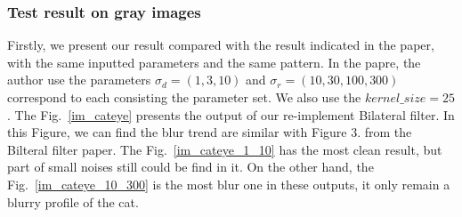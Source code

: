 \documentclass[12pt]{article}
\begin{document}
\subsubsection{Test result on gray images}
\label{subsection test gray}
Firstly, we present our result compared with the result indicated in the paper, with the same inputted parameters and the same pattern.
In the papre, the author use the parameters $\sigma_d = (1, 3, 10)$ and $\sigma_r = (10, 30, 100, 300)$ correspond to each consisting the parameter set.  
We also use the $kernel\_size = 25$.
The Fig.~\ref{im_cateye} presents the output of our re-implement Bilateral filter.
In this Figure, we can find the blur trend are similar with Figure 3. from the Bilteral filter paper.
The Fig.~\ref{im_cateye_1_10} has the most clean result, but part of small noises still could be find in it. 
On the other hand, the Fig.~\ref{im_cateye_10_300} is the most blur one in these outputs, it only remain a blurry profile of the cat. 
\end{document}
